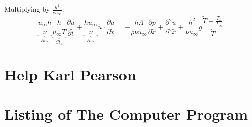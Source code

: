 \documentclass[11pt, a4paper]{article}
\newcommand{\parder}[2]{\frac{\partial {#1}}{\partial {#2}}}
\begin{document}
Multiplying by $\displaystyle\frac{h^2}{\nu u_\infty}$:
\begin{equation}
    \underbrace{\frac{u_\infty h}{\nu}}_\text{$Re_h$}\underbrace{\frac{h}{u_\infty T}}_\text{$St_h$}\parder{\tilde{u}}{\tilde{t}}+\underbrace{\frac{h u_\infty}{\nu}}_\text{$Re_h$}\tilde{u}\cdot\parder{\tilde{u}}{\tilde{x}}=-\frac{h\Lambda}{\rho\nu u_\infty}\parder{\tilde{p}}{\tilde{x}}+\parder{^2\tilde{u}}{^2\tilde{x}}+\frac{h^2}{\nu u_\infty}g\frac{\tilde{T}-\displaystyle\frac{T_h}{T_\infty}}{\tilde{T}}
\end{equation}

\section{Help Karl Pearson}





\newpage
\appendix
\section{Listing of The Computer Program}

\end{document}
